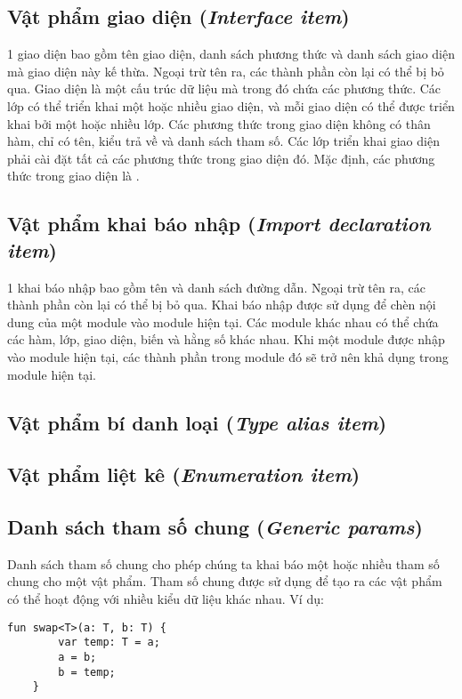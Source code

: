 \subsection{Vật phẩm giao diện (\textit{Interface item})}

\regexinterfaceitem

1 giao diện bao gồm tên giao diện, danh sách phương thức và danh sách giao diện mà giao diện này kế thừa. Ngoại trừ tên ra, các thành phần còn lại có thể bị bỏ qua. Giao diện là một cấu trúc dữ liệu mà trong đó chứa các phương thức. Các lớp có thể triển khai một hoặc nhiều giao diện, và mỗi giao diện có thể được triển khai bởi một hoặc nhiều lớp. Các phương thức trong giao diện không có thân hàm, chỉ có tên, kiểu trả về và danh sách tham số. Các lớp triển khai giao diện phải cài đặt tất cả các phương thức trong giao diện đó. Mặc định, các phương thức trong giao diện là .

\subsection{Vật phẩm khai báo nhập (\textit{Import declaration item})}

\regeximportitem

1 khai báo nhập bao gồm tên và danh sách đường dẫn. Ngoại trừ tên ra, các thành phần còn lại có thể bị bỏ qua. Khai báo nhập được sử dụng để chèn nội dung của một module vào module hiện tại. Các module khác nhau có thể chứa các hàm, lớp, giao diện, biến và hằng số khác nhau. Khi một module được nhập vào module hiện tại, các thành phần trong module đó sẽ trở nên khả dụng trong module hiện tại.

\subsection{Vật phẩm bí danh loại (\textit{Type alias item})}

\subsection{Vật phẩm liệt kê (\textit{Enumeration item})}

\subsection{Danh sách tham số chung (\textit{Generic params})}

\regexgenparams

Danh sách tham số chung cho phép chúng ta khai báo một hoặc nhiều tham số chung cho một vật phẩm. Tham số chung được sử dụng để tạo ra các vật phẩm có thể hoạt động với nhiều kiểu dữ liệu khác nhau. Ví dụ:

\begin{lstlisting}[]
    fun swap<T>(a: T, b: T) {
        var temp: T = a;
        a = b;
        b = temp;
    }
\end{lstlisting}
